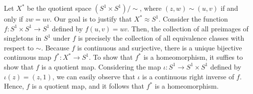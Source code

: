 \begin{exmp}
    Let $X^*$ be the quotient space $(S^1\times S^1)/\sim$, where $(z, w)\sim(u, v)$ if and only if $zw=uv$.
    Our goal is to justify that $X^*\approx S^1$.
    Consider the function $f: S^1\times S^1\rightarrow S^1$ defined by $f(u, v)=uv$.
    Then, the collection of all preimages of singletons in $S^1$ under $f$ is precisely the collection of all equivalence classes with respect to $\sim$.
    Because $f$ is continuous and surjective, there is a unique bijective continuous map $f^*: X^*\rightarrow S^1$.
    To show that $f^*$ is a homeomorphism, it suffies to show that $f$ is a quotient map.
    Considering the map $\iota: S^1\rightarrow S^1\times S^1$ defined by $\iota(z)=(z, 1)$, we can easily observe that $\iota$ is a continuous right inverse of $f$.
    Hence, $f$ is a quotient map, and it follows that $f^*$ is a homeomorphism.
\end{exmp}

